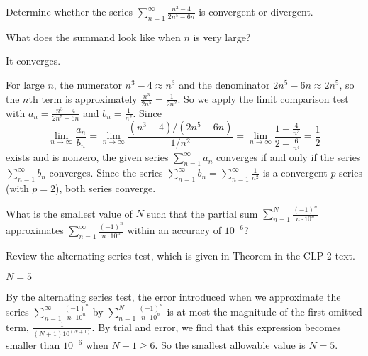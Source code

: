 \begin{question}[2016Q6]
Determine whether the series
$\displaystyle\sum_{n=1}^\infty\frac{n^3-4}{2n^5-6n}$
is convergent or divergent.
\end{question}

\begin{hint}
What does the summand look like when $n$ is very large?
\end{hint}

\begin{answer}
It converges.
\end{answer}

\begin{solution}
For large $n$, the numerator $n^3-4\approx n^3$ and the denominator
$2n^5-6n\approx 2n^5$, so the $n$th term is approximately
$\frac{n^3}{2n^5}=\frac{1}{2n^2}$. So we apply the limit comparison
test with $a_n=\frac{n^3-4}{2n^5-6n}$ and $b_n=\frac{1}{n^2}$. Since
\begin{equation*}
\lim_{n\rightarrow\infty}\frac{a_n}{b_n}
=\lim_{n\rightarrow\infty}\frac{(n^3-4)/(2n^5-6n)}{1/n^2}
=\lim_{n\rightarrow\infty}\frac{1-\frac{4}{n^3}}{2-\frac{6}{n^4}}
=\frac12
\end{equation*}
exists and is nonzero, the given series $\sum\limits_{n=1}^\infty a_n$ converges if and only
if the series $\sum\limits_{n=1}^\infty b_n$ converges.
Since the series $\sum\limits_{n=1}^\infty b_n
=\sum\limits_{n=1}^\infty\frac{1}{n^2}$
is a convergent $p$-series (with $p=2$), both series converge.
\end{solution}

\begin{question}[2016Q6]
What is the smallest value of $N$ such that the partial sum
$
\displaystyle\sum_{n=1}^N\frac{(-1)^n}{n\cdot 10^n}
$
approximates
$
\displaystyle\sum_{n=1}^\infty\frac{(-1)^n}{n\cdot 10^n}
$
within an accuracy of $10^{-6}$?
\end{question}

\begin{hint}
Review the alternating series test, which is given in
Theorem  in the
CLP-2 text.
\end{hint}

\begin{answer}
$N=5$
\end{answer}

\begin{solution}
By the alternating series test, the error introduced when we approximate
the series
$\displaystyle
\sum_{n=1}^\infty\frac{(-1)^n}{n\cdot 10^n}
$
by
$\displaystyle
\sum_{n=1}^N\frac{(-1)^n}{n\cdot 10^n}
$
is at most the magnitude of the  first omitted term,
$\displaystyle\frac1{(N+1) 10^{(N+1)}}$. By trial and error, we find that this expression becomes
smaller than $10^{-6}$ when $N+1\ge 6$. So the smallest
allowable value is $N=5$.

\end{solution}




